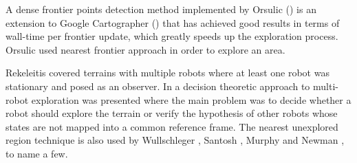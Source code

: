 A dense frontier points detection method implemented by Orsulic (\cite{Orsulic2019}) is an extension to Google Cartographer (\cite{Hess2016}) that has achieved good results in terms of wall-time per frontier update, which greatly speeds up the exploration process. Orsulic used nearest frontier approach in order to explore an area. 

Rekeleitis \cite{Rekeleitis2000} covered terrains with multiple robots where at least one robot was stationary and posed as an observer. In \cite{Fox2006} a decision theoretic approach to multi-robot exploration was presented where the main problem was to decide whether a robot should explore the terrain or verify the hypothesis of other robots whose states are not mapped into a common reference frame. The nearest unexplored region technique is also used by Wullschleger \cite{Wullschleger99}, Santosh \cite{Santosh2008}, Murphy and Newman \cite{Murphy2008}, to name a few.


